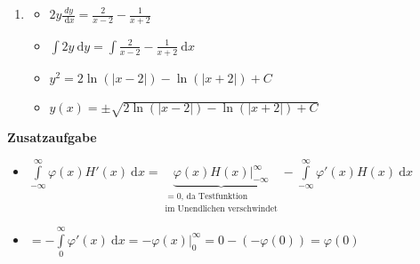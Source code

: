 \documentclass[12pt]{article}
\providecommand\d{}
\renewcommand{\d}[1]{\:\mathrm{d}{#1}}
\begin{document}
\begin{enumerate}
\begin{enumerate}
\item 
\begin{itemize}
\item $2y\frac{d{y}}{\d{x}} = \frac{2}{x-2} - \frac{1}{x+2}$
\item $\int 2y \d y = \int \frac{2}{x-2} - \frac{1}{x+2} \d x$
\item $y^2 = 2\ln(|x-2|) - \ln(|x+2|) + C$
\item $y(x) = \pm \sqrt{2\ln(|x-2|) - \ln(|x+2|) + C}$
\end{itemize}

\end{enumerate}

\end{enumerate}

\textbf{Zusatzaufgabe}

\begin{itemize}
\item $\int\limits_{-\infty}^\infty \varphi(x) H'(x) \d{x} = \underbrace{\varphi(x)H(x) \Big|_{-\infty}^\infty}_{\substack{=0\text{, da Testfunktion} \\ \text{im Unendlichen verschwindet}}} - \int\limits_{-\infty}^\infty \varphi'(x)H(x) \d{x}$
\item $ = -\int\limits_0^\infty \varphi'(x) \d{x} = -\varphi(x)\Big|_0^\infty = 0-(-\varphi(0)) = \varphi(0)$
\end{itemize}
\end{document}
